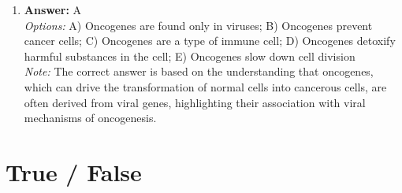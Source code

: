 \documentclass[12pt]{article}
\begin{document}
\begin{enumerate}[label=\arabic*.]
\item \textbf{Answer:} A
\\ \textit{Options:} A) Oncogenes are found only in viruses; B) Oncogenes prevent cancer cells; C) Oncogenes are a type of immune cell; D) Oncogenes detoxify harmful substances in the cell; E) Oncogenes slow down cell division
\\ \textit{Note:} The correct answer is based on the understanding that oncogenes, which can drive the transformation of normal cells into cancerous cells, are often derived from viral genes, highlighting their association with viral mechanisms of oncogenesis.
\end{enumerate}

\section*{True / False}
\end{document}
